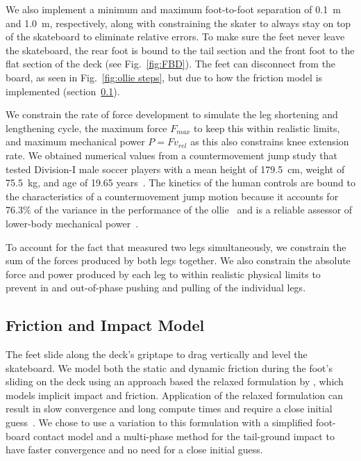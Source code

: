 \documentclass[default,iicol]{sn-jnl}
\begin{document}
We also implement a minimum and maximum foot-to-foot separation of \SI{0.1}{\meter} and \SI{1.0}{\meter}, respectively, along with constraining the skater to always stay on top of the skateboard to eliminate relative errors.
To make sure the feet never leave the skateboard, the rear foot is bound to the tail section and the front foot to the flat section of the deck (see Fig.~\ref{fig:FBD}).
The feet can disconnect from the board, as seen in Fig.~\ref{fig:ollie steps}, but due to how the friction model is implemented (section~\ref{ss_friction}).

We constrain the rate of force development to simulate the leg shortening and lengthening cycle, the maximum force $F_{max}$ to keep this within realistic limits, and maximum mechanical power $P = F v_{rel}$ as this also constrains knee extension rate. We obtained numerical values from a countermovement jump study that tested Division-I male soccer players with a mean height of \SI{179.5}{\centi\meter}, weight of \SI{75.5}{\kilo\gram}, and age of 19.65 years~\cite{barker_relationships_2018}. The kinetics of the human controls are bound to the characteristics of a countermovement jump motion because it accounts for 76.3\% of the variance in the performance of the ollie~\cite{candotti_lower_2012} and is a reliable assessor of lower-body mechanical power~\cite{barker_relationships_2018}. 

To account for the fact that \citet{barker_relationships_2018} measured two legs simultaneously, we constrain the sum of the forces produced by both legs together. We also constrain the absolute force and power produced by each leg to within realistic physical limits to prevent in and out-of-phase pushing and pulling of the individual legs.

\subsection{Friction and Impact Model} \label{ss_friction}
The feet slide along the deck's griptape to drag vertically and level the skateboard. We model both the static and dynamic friction during the foot's sliding on the deck using an approach based the relaxed formulation by \citet{patel_contact-implicit_2019}, which models implicit impact and friction.
Application of the relaxed formulation can result in slow convergence and long compute times and require a close initial guess~\cite{shield_contact-implicit_2022}. We chose to use a variation to this formulation with a simplified foot-board contact model and a multi-phase method for the tail-ground impact to have faster convergence and no need for a close initial guess.
\end{document}
